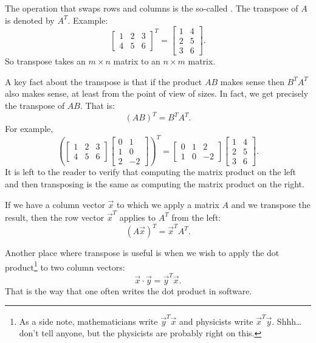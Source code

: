 The operation that swaps rows and columns is the so-called
\emph{}.
The transpose of $A$ is denoted by $A^T$.  Example:
\begin{equation*}
\begin{bmatrix}
1 & 2 & 3 \\
4 & 5 & 6
\end{bmatrix}^T =
\begin{bmatrix}
1 & 4 \\
2 & 5 \\
3 & 6 
\end{bmatrix} .
\end{equation*}
So transpose takes an $m \times n$ matrix to an $n \times m$ matrix.

A key fact about the transpose is that if the product $AB$ makes sense
then $B^TA^T$ also makes sense, at least from the point of view of sizes.
In fact, we get precisely the transpose of $AB$.  That is:
\begin{equation*}
{(AB)}^T = B^TA^T .
\end{equation*}
For example,
\begin{equation*}
{\left(
\begin{bmatrix}
1 & 2 & 3 \\
4 & 5 & 6
\end{bmatrix}
\begin{bmatrix}
0 & 1 \\
1 & 0 \\
2 & -2
\end{bmatrix}
\right)}^T =
\begin{bmatrix}
0 & 1 & 2 \\
1 & 0 & -2
\end{bmatrix}
\begin{bmatrix}
1 & 4 \\
2 & 5 \\
3 & 6 
\end{bmatrix} .
\end{equation*}
It is left to the reader to verify that computing the matrix product on the
left and then transposing is the same as computing the matrix product on the
right.

If we have a column vector $\vec{x}$ to which we apply a matrix $A$
and we transpose the result,
then the row vector $\vec{x}^T$ applies to $A^T$ from the left:
\begin{equation*}
{(A\vec{x})}^T = \vec{x}^TA^T .
\end{equation*}

Another place where transpose is useful is when we wish to apply the dot
product\footnote{As a side note, mathematicians
write $\vec{y}^T\vec{x}$ and physicists
write $\vec{x}^T\vec{y}$.  Shhh\ldots don't tell anyone, but the physicists
are probably right on this.}
to two column vectors:
\begin{equation*}
\vec{x} \cdot \vec{y} = \vec{y}^T \vec{x} .
\end{equation*}
That is the way that one often writes the dot product in software.

